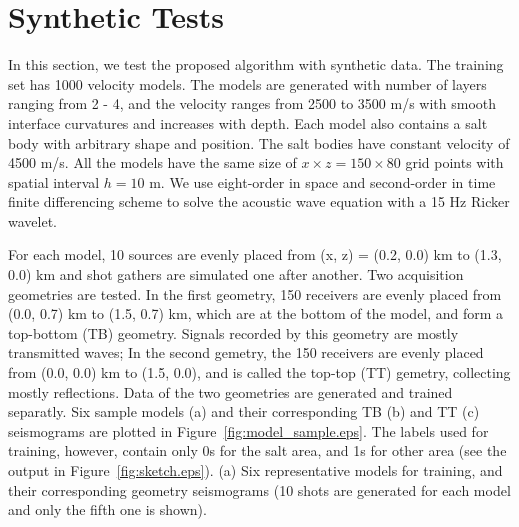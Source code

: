 \documentclass{segabs}
\begin{document}


\section{Synthetic Tests}
In this section, we test the proposed algorithm with synthetic data. 
The training set has 1000 velocity models. The models are generated with number of layers ranging from 2 - 4, and the velocity ranges from 2500 to 3500 m/s with smooth interface curvatures and increases with depth. Each model also contains a salt body with arbitrary shape and position. The salt bodies have constant velocity of 4500 m/s. All the models have the same size of $x\times z = 150 \times 80$ grid points with spatial interval $h=10$ m. 
We use eight-order in space and second-order in time finite differencing scheme to solve the acoustic wave equation with a 15 Hz Ricker wavelet.

For each model, 10 sources are evenly placed from (x, z) = (0.2, 0.0) km to (1.3, 0.0) km and shot gathers are simulated one after another. 
Two acquisition geometries are tested. In the first geometry, 150 receivers are evenly placed from (0.0, 0.7) km to (1.5, 0.7) km, which are at the bottom of the model, and form a top-bottom (TB) geometry. Signals recorded by this geometry are mostly transmitted waves;
In the second gemetry, the 150 receivers are evenly placed from (0.0, 0.0) km to (1.5, 0.0), and is called the top-top (TT) gemetry, collecting mostly reflections. Data of the two geometries are generated and trained separatly.  
Six sample models (a) and their corresponding TB (b) and TT (c) seismograms are plotted in Figure~\ref{fig:model_sample.eps}. The labels used for training, however, contain only 0s for the salt area, and 1s for other area (see the output in Figure~\ref{fig:sketch.eps}). 
{(a) Six representative models for training, and their corresponding geometry seismograms (10 shots are generated for each model and only the fifth one is shown).}
\end{document}

